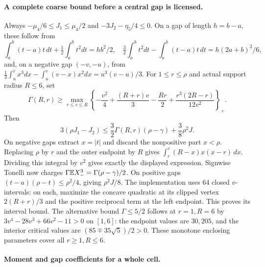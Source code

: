 \paragraph{A complete coarse bound before a central gap is licensed.}
Always $-\mu_4/6\le J_1\le\mu_4/2$ and
$-3J_2-\eta_5/4\le0$. On a gap of length $h=b-a$, these follow from
\[
 \int_a^b(t-a)t\,dt+\tfrac12\int_a^bt^2dt=hb^2/2,\quad
 \tfrac32\int_a^bt^2dt-\int_a^b(t-a)t\,dt=h(2a+b)^2/6,
\]
and, on a negative gap $(-v,-u)$, from
$\tfrac13\int_u^v x^3dx-\int_u^v(v-x)x^2dx=u^3(v-u)/3$.
For $1\le r\le\rho$ and actual support radius $R\le6$, set
\[
 \Gamma(R,r)\ge\max_{r\le v\le R}
 \left\{-\frac{v^2}4+\frac{(R+r)v}3-\frac{Rr}2+
                      \frac{r^3(2R-r)}{12v^2}\right\}_+.
\]
Then
\[
 3(\rho J_1-J_2)\le\frac32\Gamma(R,r)(\rho-\gamma)
                              +\frac38\rho^2J.
\]
On negative gaps extract $x=|t|$ and discard the nonpositive part
$x<\rho$. Replacing $\rho$ by $r$ and the outer endpoint by $R$
gives $\int_r^v(R-x)x(x-r)\,dx$. Dividing this integral by $v^2$
gives exactly the displayed expression. Signwise Tonelli now charges
$\Gamma\mathbb E X_-^3=\Gamma(\rho-\gamma)/2$.
On positive gaps $(t-a)(\rho-t)\le\rho^2/4$, giving $\rho^2J/8$.
The implementation uses 64 closed $v$-intervals: on each, maximize the
concave quadratic at its clipped vertex $2(R+r)/3$ and the positive
reciprocal term at the left endpoint. This proves its interval bound.
The alternative bound $\Gamma\le5/2$ follows at $r=1,R=6$ by
$3v^4-28v^3+66v^2-11>0$ on $[1,6]$: the endpoint values are $30,205$,
and the interior critical values are $(85\mp35\sqrt5)/2>0$.
These monotone enclosing parameters cover all $r\ge1,R\le6$.
\paragraph{Moment and gap coefficients for a whole cell.}
\label{j:local:mom:conditional-boxes}

